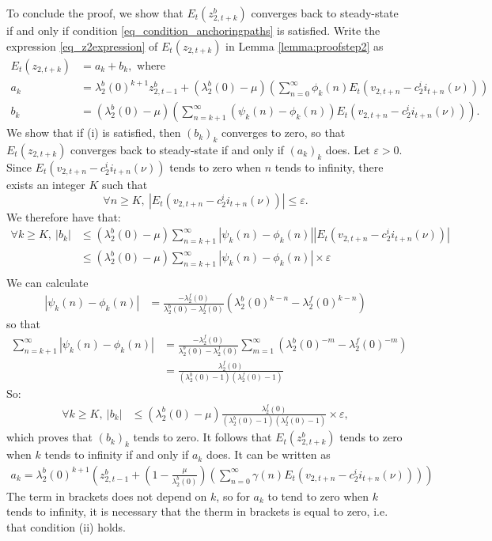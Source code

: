 To conclude the proof, we show that $E_t(z^b_{2,t+k})$ converges back to steady-state if and only if condition \eqref{eq_condition_anchoringpaths} is satisfied. Write the expression \eqref{eq_z2expression} of $E_t(z_{2,t+k})$ in Lemma \eqref{lemma:proofstep2} as
\begin{align*}
E_t(z_{2,t+k}) &= a_k + b_k, \text{ where }\\
a_k &= \lambda^b_2(0)^{k+1} z^b_{2,t-1} + (\lambda^b_2(0)-\mu) \left(
\sum_{n=0}^{\infty} \phi_k(n) E_t(v_{2,t+n}-c^i_2 i_{t+n}(\nu))\right)\\
b_k &= (\lambda^b_2(0)-\mu)  \left(\sum_{n=k+1}^{\infty} (\psi_k(n)-\phi_k(n)) E_t(v_{2,t+n}-c^i_2 i_{t+n}(\nu))\right).
\end{align*}
We show that if (i) is satisfied, then $(b_k)_k$ converges to zero, so that $E_t(z_{2,t+k})$ converges back to steady-state if and only if $(a_k)_k$ does. Let $\varepsilon >0$. Since $E_t(v_{2,t+n}-c^i_2 i_{t+n}(\nu))$ tends to zero when $n$ tends to infinity, there exists an integer $K$ such that
$$
\forall n\geq K,\  |E_t(v_{2,t+n}-c^i_2 i_{t+n}(\nu))| \leq \varepsilon.
$$
We therefore have that:
\begin{align*}
\forall k\geq K,\  |b_k|&\leq (\lambda^b_2(0)-\mu) \sum_{n=k+1}^{\infty} |\psi_k(n)-\phi_k(n)| |E_t(v_{2,t+n}-c^i_2 i_{t+n}(\nu))|\\
&\leq (\lambda^b_2(0)-\mu) \sum_{n=k+1}^{\infty} |\psi_k(n)-\phi_k(n)| \times \varepsilon \\
\end{align*}
We can calculate
\begin{align*}
|\psi_k(n)-\phi_k(n)|&=\frac{-\lambda^f_2(0)}{\lambda^b_2(0)-\lambda^f_2(0)}(\lambda^b_2(0)^{k-n} -\lambda^f_2(0)^{k-n})
\end{align*}
so that 
\begin{align*}
\sum_{n=k+1}^{\infty} |\psi_k(n)-\phi_k(n)| &=\frac{-\lambda^f_2(0)}{\lambda^b_2(0)-\lambda^f_2(0)} \sum_{m=1}^{\infty} (\lambda^b_2(0)^{-m} - \lambda^f_2(0)^{-m})\\
&= \frac{\lambda^f_2(0)}{(\lambda^b_2(0)-1)(\lambda^f_2(0)-1)}
\end{align*}
So:
\begin{align*}
\forall k\geq K,\ |b_k|&\leq (\lambda^b_2(0)-\mu) \frac{\lambda^f_2(0)}{(\lambda^b_2(0)-1)(\lambda^f_2(0)-1)}\times \varepsilon,
\end{align*}
which proves that $(b_k)_k$ tends to zero. It follows that $E_t(z_{2,t+k}^b)$ tends to zero when $k$ tends to infinity if and only if $a_k$ does. It can be written as
\begin{align*}
a_k = \lambda^b_2(0)^{k+1} \left(z^b_{2,t-1} + \left(1-\frac{\mu}{\lambda^b_2(0)}\right) \left(
\sum_{n=0}^{\infty} \gamma(n) E_t(v_{2,t+n}-c^i_2 i_{t+n}(\nu)) \right)\right)
\end{align*}
The term in brackets does not depend on $k$, so for $a_k$ to tend to zero when $k$ tends to infinity, it is necessary that the therm in brackets is equal to zero, i.e. that condition (ii) holds.


